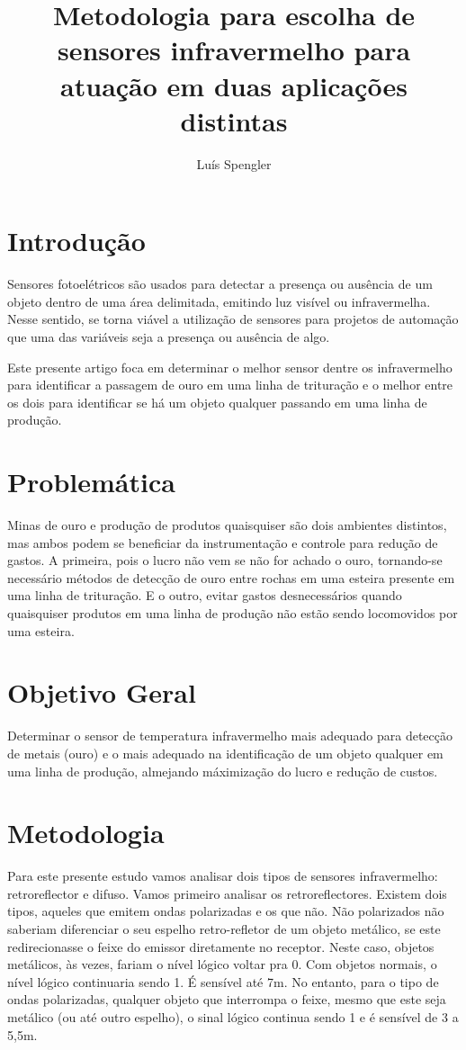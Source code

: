 \documentclass{article}
\title{Metodologia para escolha de sensores infravermelho para atuação em duas aplicações distintas}
\date{}
\author[1]{Luís Spengler}
\affil[1]{Instituto Federal de Educação, Ciência e Tecnologia de Mato Grosso do Sul}
\begin{document}
\maketitle

\section{Introdução}
Sensores fotoelétricos são usados para detectar a presença ou ausência de um objeto dentro de uma área delimitada, emitindo luz visível ou infravermelha. 
Nesse sentido, se torna viável a utilização de sensores para projetos de automação que uma das variáveis seja a presença ou ausência de algo.

Este presente artigo foca em determinar o melhor sensor dentre os infravermelho para identificar a passagem de ouro em uma linha de trituração e o melhor entre os dois para identificar se há um objeto qualquer passando em uma linha de produção.
\section{Problemática}
Minas de ouro e produção de produtos quaisquiser são dois ambientes distintos, mas ambos podem se beneficiar da instrumentação e controle para redução de gastos. A primeira, pois o lucro não vem se não for achado o ouro, tornando-se necessário métodos de detecção de ouro entre rochas em uma esteira presente em uma linha de trituração. E o outro, evitar gastos desnecessários quando quaisquiser produtos em uma linha de produção não estão sendo locomovidos por uma esteira.

\section{Objetivo Geral}
Determinar o sensor de temperatura infravermelho mais adequado para detecção de metais (ouro) e o mais adequado na identificação de um objeto qualquer em uma linha de produção, almejando máximização do lucro e redução de custos.

\section{Metodologia}
Para este presente estudo vamos analisar dois tipos de sensores infravermelho: retroreflector e difuso. Vamos primeiro analisar os retroreflectores. Existem dois tipos, aqueles que emitem ondas polarizadas e os que não. Não polarizados não saberiam diferenciar o seu espelho retro-refletor de um objeto metálico, se este redirecionasse o feixe do emissor diretamente no receptor. Neste caso, objetos metálicos, às vezes, fariam o nível lógico voltar pra 0. Com objetos normais, o nível lógico continuaria sendo 1. É sensível até 7m. No entanto, para o tipo de ondas polarizadas, qualquer objeto que interrompa o feixe, mesmo que este seja metálico (ou até outro espelho), o sinal lógico continua sendo 1 e é sensível de 3 a 5,5m. 
\end{document}
